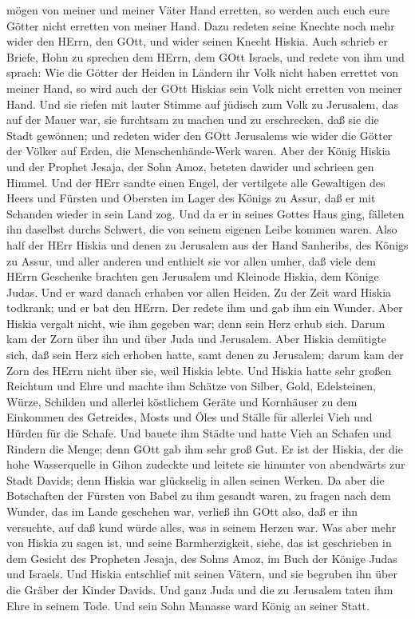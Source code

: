 mögen von meiner und meiner Väter Hand erretten, so werden auch euch
eure Götter nicht erretten von meiner Hand.  Dazu redeten
seine Knechte noch mehr wider den HErrn, den GOtt, und wider seinen
Knecht Hiskia.  Auch schrieb er Briefe, Hohn zu sprechen
dem HErrn, dem GOtt Israels, und redete von ihm und sprach: Wie die
Götter der Heiden in Ländern ihr Volk nicht haben errettet von meiner
Hand, so wird auch der GOtt Hiskias sein Volk nicht erretten von meiner
Hand.  Und sie riefen mit lauter Stimme auf jüdisch zum
Volk zu Jerusalem, das auf der Mauer war, sie furchtsam zu machen und zu
erschrecken, daß sie die Stadt gewönnen;  und redeten wider
den GOtt Jerusalems wie wider die Götter der Völker auf Erden, die
Menschenhände-Werk waren.  Aber der König Hiskia und der
Prophet Jesaja, der Sohn Amoz, beteten dawider und schrieen gen Himmel.
 Und der HErr sandte einen Engel, der vertilgete alle
Gewaltigen des Heers und Fürsten und Obersten im Lager des Königs zu
Assur, daß er mit Schanden wieder in sein Land zog. Und da er in seines
Gottes Haus ging, fälleten ihn daselbst durchs Schwert, die von seinem
eigenen Leibe kommen waren.  Also half der HErr Hiskia und
denen zu Jerusalem aus der Hand Sanheribs, des Königs zu Assur, und
aller anderen und enthielt sie vor allen umher,  daß viele
dem HErrn Geschenke brachten gen Jerusalem und Kleinode Hiskia, dem
Könige Judas. Und er ward danach erhaben vor allen Heiden. 
Zu der Zeit ward Hiskia todkrank; und er bat den HErrn. Der redete ihm
und gab ihm ein Wunder.  Aber Hiskia vergalt nicht, wie ihm
gegeben war; denn sein Herz erhub sich. Darum kam der Zorn über ihn und
über Juda und Jerusalem.  Aber Hiskia demütigte sich, daß
sein Herz sich erhoben hatte, samt denen zu Jerusalem; darum kam der
Zorn des HErrn nicht über sie, weil Hiskia lebte.  Und
Hiskia hatte sehr großen Reichtum und Ehre und machte ihm Schätze von
Silber, Gold, Edelsteinen, Würze, Schilden und allerlei köstlichem
Geräte  und Kornhäuser zu dem Einkommen des Getreides,
Mosts und Öles und Ställe für allerlei Vieh und Hürden für die Schafe.
 Und bauete ihm Städte und hatte Vieh an Schafen und
Rindern die Menge; denn GOtt gab ihm sehr groß Gut.  Er ist
der Hiskia, der die hohe Wasserquelle in Gihon zudeckte und leitete sie
hinunter von abendwärts zur Stadt Davids; denn Hiskia war glückselig in
allen seinen Werken.  Da aber die Botschaften der Fürsten
von Babel zu ihm gesandt waren, zu fragen nach dem Wunder, das im Lande
geschehen war, verließ ihn GOtt also, daß er ihn versuchte, auf daß kund
würde alles, was in seinem Herzen war.  Was aber mehr von
Hiskia zu sagen ist, und seine Barmherzigkeit, siehe, das ist
geschrieben in dem Gesicht des Propheten Jesaja, des Sohns Amoz, im Buch
der Könige Judas und Israels.  Und Hiskia entschlief mit
seinen Vätern, und sie begruben ihn über die Gräber der Kinder Davids.
Und ganz Juda und die zu Jerusalem taten ihm Ehre in seinem Tode. Und
sein Sohn Manasse ward König an seiner Statt.

